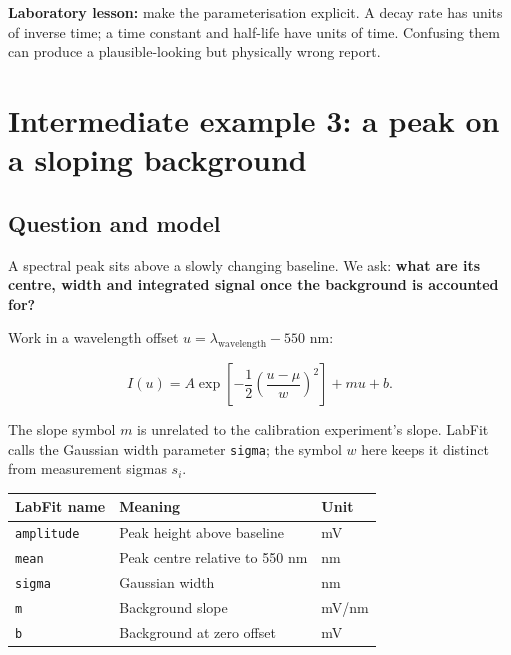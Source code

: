 \documentclass[
  british,
  10pt,
  a4paper,
]{article}
\newcommand{\passthrough}[1]{#1}
\begin{document}
\textbf{Laboratory lesson:} make the parameterisation explicit. A decay
rate has units of inverse time; a time constant and half-life have units
of time. Confusing them can produce a plausible-looking but physically
wrong report.

\clearpage

\section{Intermediate example 3: a peak on a sloping
background}\label{intermediate-example-3-a-peak-on-a-sloping-background}


\subsection{Question and model}\label{question-and-model-2}

A spectral peak sits above a slowly changing baseline. We ask:
\textbf{what are its centre, width and integrated signal once the
background is accounted for?}

Work in a wavelength offset \(u=\lambda_{\mathrm{wavelength}}-550\) nm:

\begin{equation}I(u)=A\exp\left[-\frac{1}{2}
\left(\frac{u-\mu}{w}\right)^2\right]+mu+b.\end{equation}

The slope symbol \(m\) is unrelated to the calibration experiment's
slope. LabFit calls the Gaussian width parameter
\passthrough{\lstinline!sigma!}; the symbol \(w\) here keeps it distinct
from measurement sigmas \(s_i\).

\begin{longtable}[]{@{}lll@{}}
\toprule\noalign{}
LabFit name & Meaning & Unit \\
\midrule\noalign{}
\endhead
\bottomrule\noalign{}
\endlastfoot
\passthrough{\lstinline!amplitude!} & Peak height above baseline & mV \\
\passthrough{\lstinline!mean!} & Peak centre relative to 550 nm & nm \\
\passthrough{\lstinline!sigma!} & Gaussian width & nm \\
\passthrough{\lstinline!m!} & Background slope & mV/nm \\
\passthrough{\lstinline!b!} & Background at zero offset & mV \\
\end{longtable}
\end{document}
